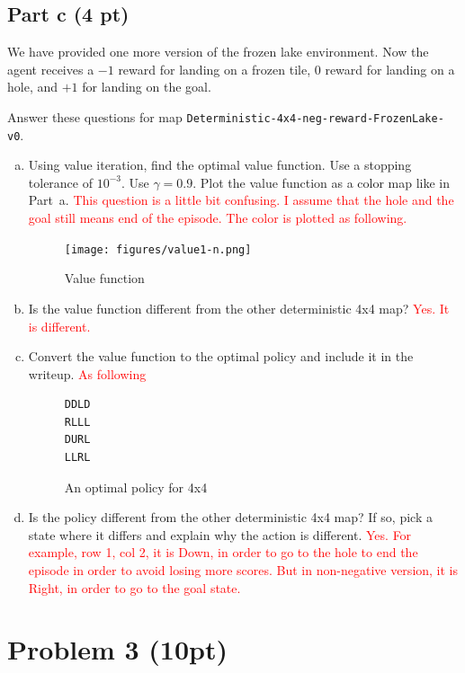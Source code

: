 \documentclass[12pt]{article}
\newcommand{\yl}[1]{\textcolor{red}{#1}}
\begin{document}
\subsection*{Part c (4 pt)}

We have provided one more version of the frozen lake environment. Now
the agent receives a $-1$ reward for landing on a frozen tile, $0$
reward for landing on a hole, and $+1$ for landing on the goal.

Answer these questions for map \texttt{Deterministic-4x4-neg-reward-FrozenLake-v0}.

\begin{enumerate}[a)]
\item Using value iteration, find the optimal value function. Use a
  stopping tolerance of $10^{-3}$. Use $\gamma=0.9$. Plot the
  value function as a color map like in Part~a.
  \yl{This question is a little bit confusing. I assume that the hole and the goal still means end of the episode. The color is plotted as following.}
  
    \begin{figure}[H]
  \centering
  \texttt{[image: figures/value1-n.png]}
  \caption{Value function}
\end{figure}

  
\item Is the value function different from the other deterministic 4x4 map? \yl{Yes. It is different.}
\item Convert the value function to the optimal policy and include it
  in the writeup. \yl{As following}
  
    \begin{figure}[H]
  \centering
  \begin{BVerbatim}
DDLD
RLLL
DURL
LLRL
  \end{BVerbatim}
  \caption{An optimal policy for 4x4}
\end{figure}
\item Is the policy different from the other deterministic 4x4 map? If
  so, pick a state where it differs and explain why the action is different. \yl{Yes. For example, row 1, col 2, it is Down, in order to go to the hole to end the episode in order to avoid losing more scores. But in non-negative version, it is Right, in order to go to the goal state.}
\end{enumerate}


\section*{Problem 3 (10pt)}
\end{document}
